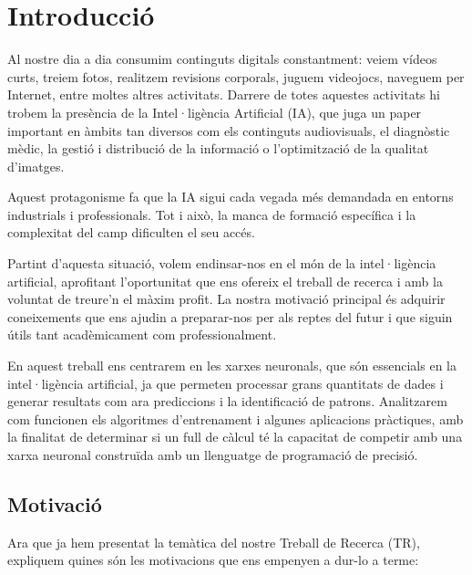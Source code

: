 \chapter{Introducció}
\label{c:intro}
Al nostre dia a dia consumim continguts digitals constantment: veiem vídeos curts, treiem fotos, realitzem revisions corporals, juguem videojocs, naveguem per Internet, entre moltes altres activitats. Darrere de totes aquestes activitats hi trobem la presència de la Intel·ligència Artificial (IA), que juga un paper important en àmbits tan diversos com els continguts audiovisuals, el diagnòstic mèdic, la gestió i distribució de la informació o l’optimització de la qualitat d’imatges.

Aquest protagonisme fa que la IA sigui cada vegada més demandada en entorns industrials i professionals. Tot i això, la manca de formació específica i la complexitat del camp dificulten el seu accés.

Partint d’aquesta situació, volem endinsar-nos en el món de la intel·ligència artificial, aprofitant l’oportunitat que ens ofereix el treball de recerca i amb la voluntat de treure’n el màxim profit. La nostra motivació principal és adquirir coneixements que ens ajudin a preparar-nos per als reptes del futur i que siguin útils tant acadèmicament com professionalment.

En aquest treball ens centrarem en les xarxes neuronals, que són essencials en la intel·ligència artificial, ja que permeten processar grans quantitats de dades i generar resultats com ara prediccions i la identificació de patrons. Analitzarem com funcionen els algoritmes d’entrenament i algunes aplicacions pràctiques, amb la finalitat de determinar si un full de càlcul té la capacitat de competir amb una xarxa neuronal construïda amb un llenguatge de programació de precisió.


\section{Motivació}

Ara que ja hem presentat la temàtica del nostre Treball de Recerca (TR), expliquem quines són les motivacions que ens empenyen a dur-lo a terme:

